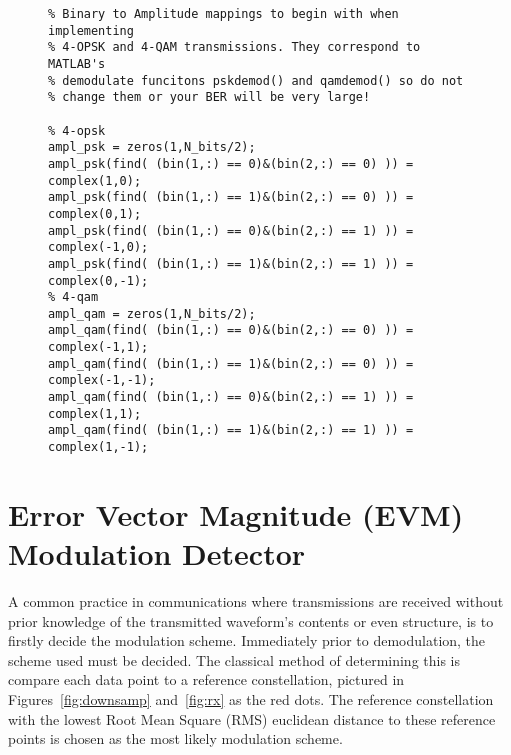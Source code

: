 \documentclass[letterpaper,12pt]{article}
\begin{document}
\FloatBarrier


\begin{figure}[h]
\centering
\begin{minipage}[framed]{0.9\textwidth}
\begin{lstlisting}
% Binary to Amplitude mappings to begin with when implementing
% 4-OPSK and 4-QAM transmissions. They correspond to MATLAB's
% demodulate funcitons pskdemod() and qamdemod() so do not
% change them or your BER will be very large!

% 4-opsk
ampl_psk = zeros(1,N_bits/2);
ampl_psk(find( (bin(1,:) == 0)&(bin(2,:) == 0) )) = complex(1,0);
ampl_psk(find( (bin(1,:) == 1)&(bin(2,:) == 0) )) = complex(0,1);
ampl_psk(find( (bin(1,:) == 0)&(bin(2,:) == 1) )) = complex(-1,0);
ampl_psk(find( (bin(1,:) == 1)&(bin(2,:) == 1) )) = complex(0,-1);
% 4-qam
ampl_qam = zeros(1,N_bits/2);
ampl_qam(find( (bin(1,:) == 0)&(bin(2,:) == 0) )) = complex(-1,1);
ampl_qam(find( (bin(1,:) == 1)&(bin(2,:) == 0) )) = complex(-1,-1);
ampl_qam(find( (bin(1,:) == 0)&(bin(2,:) == 1) )) = complex(1,1);
ampl_qam(find( (bin(1,:) == 1)&(bin(2,:) == 1) )) = complex(1,-1);
\end{lstlisting}
\end{minipage}
\captionsetup{labelformat=empty}
\end{figure}

\FloatBarrier

\section{Error Vector Magnitude (EVM) Modulation Detector}
\label{evm}

A common practice in communications where transmissions are received without prior knowledge of the transmitted waveform's contents or even structure, is to firstly decide the modulation scheme. Immediately prior to demodulation, the scheme used must be decided. The classical method of determining this is compare each data point to a reference constellation, pictured in Figures~\ref{fig:downsamp} and~\ref{fig:rx} as the red dots. The reference constellation with the lowest Root Mean Square (RMS) euclidean distance to these reference points is chosen as the most likely modulation scheme.
\end{document}
